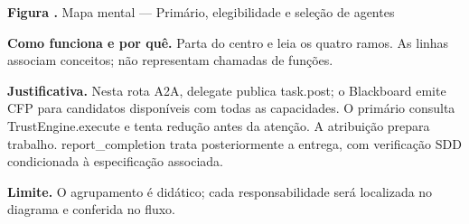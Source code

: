 {\small\textbf{Figura \thefigure.} Mapa mental --- Primário, elegibilidade e seleção de agentes}\par\smallskip
\noindent\textbf{Como funciona e por quê.} Parta do centro e leia os quatro ramos. As linhas associam conceitos; não representam chamadas de funções.\par
\noindent\textbf{Justificativa.} Nesta rota A2A, delegate publica task.post; o Blackboard emite CFP para candidatos disponíveis com todas as capacidades. O primário consulta TrustEngine.execute e tenta redução antes da atenção. A atribuição prepara trabalho. report\_completion trata posteriormente a entrega, com verificação SDD condicionada à especificação associada.\par
\noindent\textbf{Limite.} O agrupamento é didático; cada responsabilidade será localizada no diagrama e conferida no fluxo.\par\smallskip
{}
